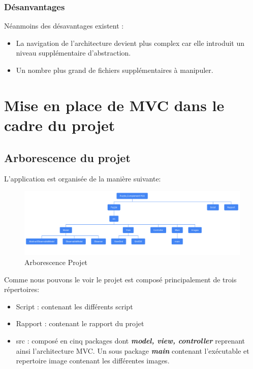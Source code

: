 \documentclass[12pt]{article}
\begin{document}
\subsubsection{Désanvantages}
Néanmoins des désavantages existent :
\begin{itemize}
    \item La navigation de l'architecture devient plus complex car elle introduit un niveau supplémentaire
    d'abstraction.
    \item Un nombre plus grand de fichiers supplémentaires à manipuler.
\end{itemize}

\section{Mise en place de MVC dans le cadre du projet}
\subsection{Arborescence du projet}
L'application est organisée de la manière suivante:
\begin{figure}[h!]
	\begin{center}
		\includegraphics[width=1.2\textwidth]{chart1.png}
	\end{center}
	\caption{Arborescence Projet}
	\label{arbre}
\end{figure}
Comme nous pouvons le voir le projet est composé principalement de trois répertoires:
\begin{itemize}
	\item Script : contenant les différents script
	\item Rapport :  contenant le rapport du projet
	\item src : composé en cinq packages dont \textbf{\textit{model, view, controller}} reprenant ainsi l'architecture MVC.
	Un sous package \textbf{\textit{main}} contenant l'exécutable et repertoire image contenant les différentes images.
\end{itemize}
\newpage
\end{document}
